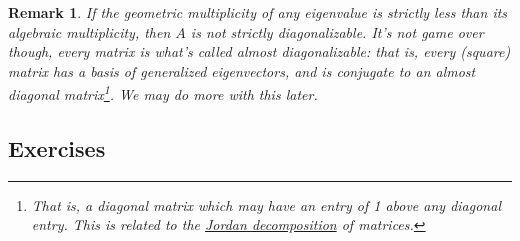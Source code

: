 \documentclass[12pt]{article}
\numberwithin{equation}{subsection}
\numberwithin{figure}{subsection}
\theoremstyle{note}
\newtheorem{remark}[subsection]{Remark}
\begin{document}
\begin{remark} 
	If the geometric multiplicity of any eigenvalue is strictly less than its algebraic multiplicity, then $A$ is not strictly diagonalizable. It's not game over though, every matrix is what's called \textit{almost diagonalizable}: that is, every (square) matrix has a basis of \textit{generalized eigenvectors}, and is conjugate to an \textit{almost diagonal} matrix\footnote{That is, a diagonal matrix which may have an entry of 1 above any diagonal entry. This is related to the \href{https://en.wikipedia.org/wiki/Jordan_normal_form}{Jordan decomposition} of matrices. }. We may do more with this later. 

\end{remark}

\subsection{Exercises} 
\end{document}
